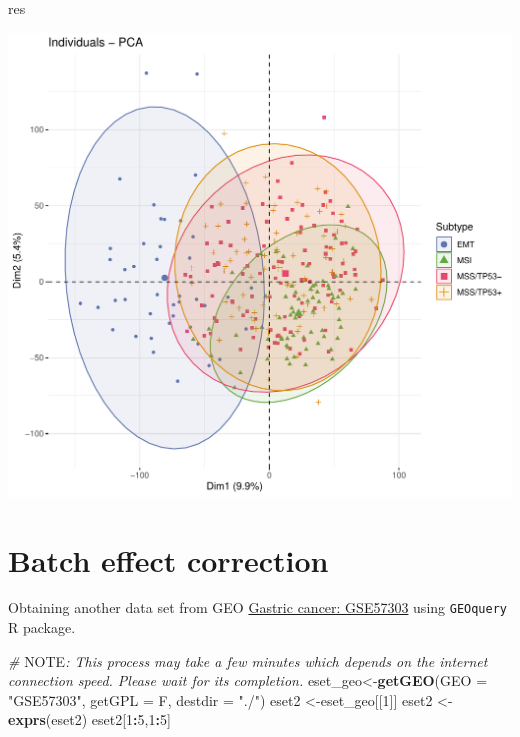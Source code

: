 \documentclass[
  12pt,
]{book}
\newenvironment{Shaded}{\begin{snugshade}}{\end{snugshade}}
\newcommand{\AlertTok}[1]{\textcolor[rgb]{0.94,0.16,0.16}{#1}}
\newcommand{\AttributeTok}[1]{\textcolor[rgb]{0.13,0.29,0.53}{#1}}
\newcommand{\CommentTok}[1]{\textcolor[rgb]{0.56,0.35,0.01}{\textit{#1}}}
\newcommand{\DecValTok}[1]{\textcolor[rgb]{0.00,0.00,0.81}{#1}}
\newcommand{\FunctionTok}[1]{\textcolor[rgb]{0.13,0.29,0.53}{\textbf{#1}}}
\newcommand{\NormalTok}[1]{#1}
\newcommand{\OtherTok}[1]{\textcolor[rgb]{0.56,0.35,0.01}{#1}}
\newcommand{\SpecialCharTok}[1]{\textcolor[rgb]{0.81,0.36,0.00}{\textbf{#1}}}
\newcommand{\StringTok}[1]{\textcolor[rgb]{0.31,0.60,0.02}{#1}}
\theoremstyle{definition}
\theoremstyle{definition}
\theoremstyle{definition}
\theoremstyle{definition}
\theoremstyle{remark}
\begin{document}
\begin{Shaded}
\begin{Highlighting}[]
\NormalTok{res}
\end{Highlighting}
\end{Shaded}

\begin{center}\includegraphics{_main_files/figure-latex/unnamed-chunk-9-1} \end{center}

\hypertarget{batch-effect-correction}{%
\section{Batch effect correction}\label{batch-effect-correction}}

Obtaining another data set from GEO \href{https://www.ncbi.nlm.nih.gov/pubmed/24935174/}{Gastric cancer: GSE57303} using \texttt{GEOquery} R package.

\begin{Shaded}
\begin{Highlighting}[]
\CommentTok{\# }\AlertTok{NOTE}\CommentTok{: This process may take a few minutes which depends on the internet connection speed. Please wait for its completion.}
\NormalTok{eset\_geo}\OtherTok{\textless{}{-}}\FunctionTok{getGEO}\NormalTok{(}\AttributeTok{GEO     =} \StringTok{"GSE57303"}\NormalTok{, }\AttributeTok{getGPL  =}\NormalTok{ F, }\AttributeTok{destdir =} \StringTok{"./"}\NormalTok{)}
\NormalTok{eset2    }\OtherTok{\textless{}{-}}\NormalTok{eset\_geo[[}\DecValTok{1}\NormalTok{]]}
\NormalTok{eset2    }\OtherTok{\textless{}{-}}\FunctionTok{exprs}\NormalTok{(eset2)}
\NormalTok{eset2[}\DecValTok{1}\SpecialCharTok{:}\DecValTok{5}\NormalTok{,}\DecValTok{1}\SpecialCharTok{:}\DecValTok{5}\NormalTok{]}
\end{Highlighting}
\end{Shaded}
\end{document}
